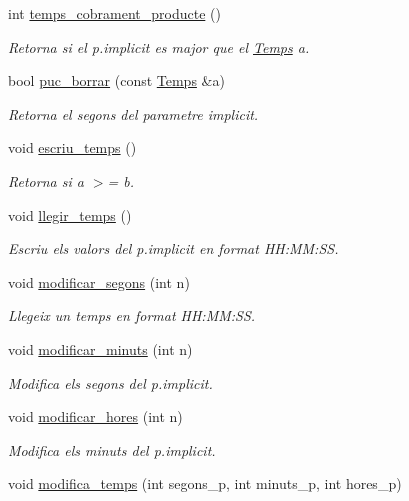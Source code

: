 \begin{DoxyCompactItemize}
int \hyperlink{class_temps_a437e8d34113c89fb223b0e96bef5b73b}{temps\-\_\-cobrament\-\_\-producte} ()
\begin{DoxyCompactList}\small\item\em Retorna si el p.\-implicit es major que el \hyperlink{class_temps}{Temps} a. \end{DoxyCompactList}\item 
bool \hyperlink{class_temps_aa9776ffab539b0a5516ab164394c256c}{puc\-\_\-borrar} (const \hyperlink{class_temps}{Temps} \&a)
\begin{DoxyCompactList}\small\item\em Retorna el segons del parametre implicit. \end{DoxyCompactList}\item 
void \hyperlink{class_temps_aaf1402577fecfa467405f0b459467cbd}{escriu\-\_\-temps} ()
\begin{DoxyCompactList}\small\item\em Retorna si a $>$= b. \end{DoxyCompactList}\item 
void \hyperlink{class_temps_a4b4fc92259fc43f85682bb7498f073e2}{llegir\-\_\-temps} ()
\begin{DoxyCompactList}\small\item\em Escriu els valors del p.\-implicit en format H\-H\-:\-M\-M\-:S\-S. \end{DoxyCompactList}\item 
void \hyperlink{class_temps_a8c35d94fdd730ed984e7dddee20b88d3}{modificar\-\_\-segons} (int n)
\begin{DoxyCompactList}\small\item\em Llegeix un temps en format H\-H\-:\-M\-M\-:S\-S. \end{DoxyCompactList}\item 
void \hyperlink{class_temps_a0960cb2b37980245fe8b0752e67dd84b}{modificar\-\_\-minuts} (int n)
\begin{DoxyCompactList}\small\item\em Modifica els segons del p.\-implicit. \end{DoxyCompactList}\item 
void \hyperlink{class_temps_aac111fd4d07983daa42e016ab60d6795}{modificar\-\_\-hores} (int n)
\begin{DoxyCompactList}\small\item\em Modifica els minuts del p.\-implicit. \end{DoxyCompactList}\item 
void \hyperlink{class_temps_a7870740e44a9a07df7eb7558822e426e}{modifica\-\_\-temps} (int segons\-\_\-p, int minuts\-\_\-p, int hores\-\_\-p)

\end{DoxyCompactItemize}

